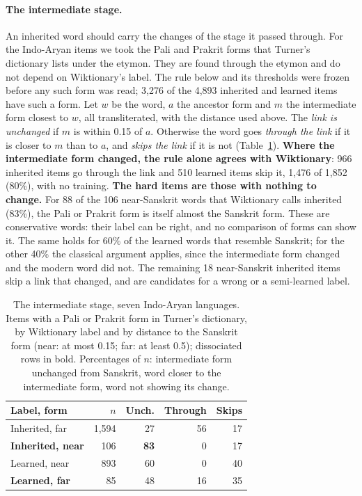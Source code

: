 \documentclass[11pt]{article}
\begin{document}
\paragraph{The intermediate stage.} An inherited word should carry the changes of the stage it passed through. For the Indo-Aryan items we took the Pali and Prakrit forms that Turner's dictionary lists under the etymon. They are found through the etymon and do not depend on Wiktionary's label. The rule below and its thresholds were frozen before any such form was read; 3,276 of the 4,893 inherited and learned items have such a form. Let $w$ be the word, $a$ the ancestor form and $m$ the intermediate form closest to $w$, all transliterated, with the distance used above. The \textit{link is unchanged} if $m$ is within 0.15 of $a$. Otherwise the word goes \textit{through the link} if it is closer to $m$ than to $a$, and \textit{skips the link} if it is not (Table~\ref{tab:link}). \textbf{Where the intermediate form changed, the rule alone agrees with Wiktionary}: 966 inherited items go through the link and 510 learned items skip it, 1,476 of 1,852 (80\%), with no training. \textbf{The hard items are those with nothing to change.} For 88 of the 106 near-Sanskrit words that Wiktionary calls inherited (83\%), the Pali or Prakrit form is itself almost the Sanskrit form. These are conservative words: their label can be right, and no comparison of forms can show it. The same holds for 60\% of the learned words that resemble Sanskrit; for the other 40\% the classical argument applies, since the intermediate form changed and the modern word did not. The remaining 18 near-Sanskrit inherited items skip a link that changed, and are candidates for a wrong or a semi-learned label.

\begin{table}[t]
\centering\small
\setlength{\tabcolsep}{4pt}
\begin{tabular}{lrrrr}
\toprule
\textbf{Label, form} & $n$ & \textbf{Unch.} & \textbf{Through} & \textbf{Skips} \\
\midrule
Inherited, far & 1,594 & 27 & 56 & 17 \\
\textbf{Inherited, near} & 106 & \textbf{83} & 0 & 17 \\
Learned, near & 893 & 60 & 0 & 40 \\
\textbf{Learned, far} & 85 & 48 & 16 & 35 \\
\bottomrule
\end{tabular}
\caption{The intermediate stage, seven Indo-Aryan languages. Items with a Pali or Prakrit form in Turner's dictionary, by Wiktionary label and by distance to the Sanskrit form (near: at most 0.15; far: at least 0.5); dissociated rows in bold. Percentages of $n$: intermediate form unchanged from Sanskrit, word closer to the intermediate form, word not showing its change.}
\label{tab:link}
\end{table}
\end{document}
